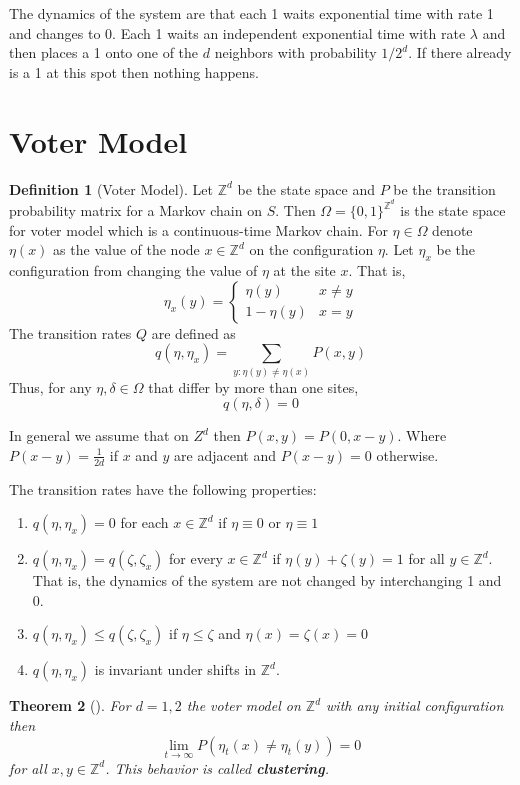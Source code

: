 \documentclass{article}
\theoremstyle{plain}
\newtheorem{theorem}{Theorem}[section]
\theoremstyle{definition}
\newtheorem{defn}[theorem]{Definition}
\theoremstyle{remark}
\numberwithin{equation}{section}
\newcommand{\Z}{\mathbb{Z}}
\begin{document}
The dynamics of the system are that each 1 waits exponential time with rate 1 and changes to 0.
Each 1 waits an independent exponential time with rate $\lambda$ and then places a 1 onto one of the $d$ neighbors with probability $1/2^d$.
If there already is a 1 at this spot then nothing happens.
\cite{steif91}

\section{Voter Model}

\begin{defn}[Voter Model] \cite{Liggett2002}
Let $\Z^d$ be the state space and $P$ be the transition probability matrix for a Markov chain on $S$.
Then $\Omega = \{0,1\}^{\Z^d}$ is the state space for voter model which is a continuous-time Markov chain.
For $\eta \in \Omega$ denote $\eta(x)$ as the value of the node $x \in \Z^d$ on the configuration $\eta$.
Let $\eta_x$ be the configuration from changing the value of $\eta$ at the site $x$. That is,
$$
\eta_x(y) = \begin{cases}
    \eta(y) & x \not = y\\
    1 - \eta(y) & x = y
\end{cases}
$$
The transition rates $Q$ are defined as
$$
q(\eta, \eta_x) = \sum_{y : \eta(y) \not = \eta(x)} P(x,y)
$$
Thus, for any $\eta, \delta \in \Omega$ that differ by more than one sites,
$$
q(\eta, \delta) = 0
$$

In general we assume that on $Z^d$ then $P(x,y) = P(0, x - y)$. Where $P(x- y) = \frac{1}{2d}$ if $x$ and $y$ are adjacent and $P(x-y) = 0$ otherwise.

The transition rates have the following properties:
\begin{enumerate}
    \item $q(\eta, \eta_x) = 0$ for each $x \in \Z^d$ if $\eta \equiv 0$ or $\eta \equiv 1$
    \item $q(\eta, \eta_x) = q(\zeta, \zeta_x)$ for every $x \in \Z^d$ if $\eta(y) + \zeta(y) = 1$ for all $y \in \Z^d$. That is, the dynamics of the system are not changed by interchanging 1 and 0.
    \item $q(\eta, \eta_x) \leq q(\zeta, \zeta_x)$ if $\eta \leq \zeta$ and $\eta(x) = \zeta(x) = 0$
    \item $q(\eta, \eta_x)$ is invariant under shifts in $\Z^d$.
\end{enumerate}
\end{defn}

\begin{theorem}[\cite{Liggett1999}]
For $d = 1,2$ the voter model on $\Z^d$ with any initial configuration then
$$
\lim_{t \to \infty} P(\eta_t(x) \not = \eta_t(y)) = 0
$$
for all $x,y \in \Z^d$.
This behavior is called \textbf{clustering}.
\end{theorem}
\end{document}
